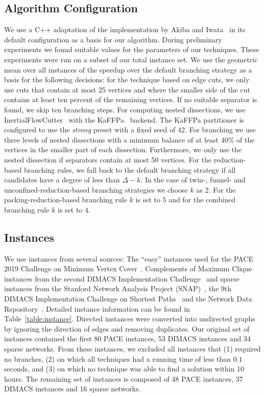 \documentclass[a4paper,UKenglish,cleveref, autoref, thm-restate]{lipics-v2021}
\begin{document}
\subsection{Algorithm Configuration}\label{sec:algo_conf}
We use a C++ adaptation of the implementation by Akiba and
Iwata~\cite{AkibaIwata} in its default configuration as a basis for our algorithm. During preliminary experiments we found
suitable values for the parameters of
our techniques. These experiments were run on a subset of our total instance
set. We use the geometric mean over all instances of the speedup over the
default branching strategy as a basis for the following decisions: for the technique based on
edge cuts, we only use cuts that contain at most 25 vertices and where the smaller side of
the cut contains at least ten percent of the remaining vertices. If no suitable separator is found, we skip ten branching steps. For computing nested dissections, we use 
InertialFlowCutter~\cite{gottesburen2019faster}
with the KaFFPa~\cite{DBLP:conf/wea/SandersS13}
backend. The KaFFPa partitioner is configured to use the \emph{strong} preset
with a fixed seed of $42$. For branching we use
three levels of nested dissections with a minimum balance of at least $40\%$ of the vertices in the smaller part of each dissection. Furthermore, we
only use the nested dissection if separators contain at most
50 vertices. For the reduction-based
branching rules, we fall back to the default branching strategy if all
candidates have a degree of less than $\Delta - k$. In the case of twin-, funnel- and unconfined-reduction-based branching strategies we choose $k$ as $2$. For the packing-reduction-based branching rule $k$ is set to $5$ and for the combined branching rule $k$ is set to $4$.

\subsection{Instances}
We use instances from several sources: The ``easy'' instances used for the
PACE 2019 Challenge on Minimum Vertex Cover~\cite{dzulfikar_et_al:LIPIcs:2019:11486}. 
Complements of Maximum Clique instances from the second DIMACS Implementation Challenge~\cite{johnson1993cliques} and sparse instances from
the Stanford Network Analysis Project (SNAP)~\cite{snapnets}, the 9th DIMACS
Implementation Challenge on Shortest Paths~\cite{demetrescu2009shortest} and the
Network Data Repository~\cite{nr}. Detailed instance information can
be found in Table~\ref{table:instance}. Directed instances were converted into
undirected graphs by ignoring the direction of edges and removing duplicates.
Our original set of instances contained the first 80 PACE instances, 53 DIMACS instances and 34 sparse networks.
From these instances, we excluded all instances that (1) required no branches, (2) on which all techniques had a running time of less than $0.1$ seconds, and (3) on which no technique was able to find a solution within 10 hours.
The remaining set of instances is composed of 48 PACE instances, 37 DIMACS
instances and 16 sparse networks.
\end{document}
